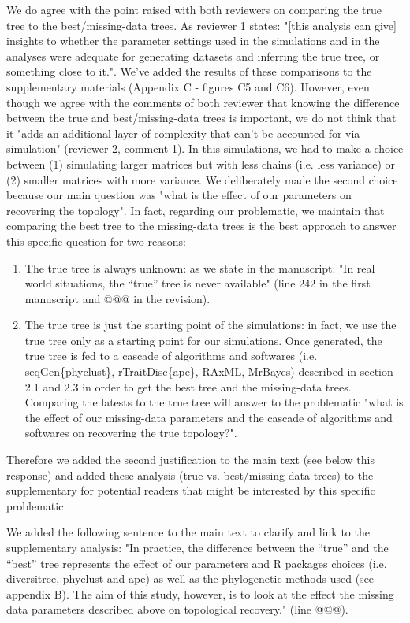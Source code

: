 \documentclass[12pt,letterpaper]{article}
\begin{document}
\begin{enumerate}
We do agree with the point raised with both reviewers on comparing the true tree to the best/missing-data trees.
As reviewer 1 states: "[this analysis can give] insights to whether the parameter settings used in the simulations and in the analyses were adequate for generating datasets and inferring the true tree, or something close to it.".
We've added the results of these comparisons to the supplementary materials (Appendix C - figures C5 and C6).
However, even though we agree with the comments of both reviewer that knowing the difference between the true and best/missing-data trees is important, we do not think that it "adds an additional layer of complexity that can't be accounted for via simulation" (reviewer 2, comment 1).
In this simulations, we had to make a choice between (1) simulating larger matrices but with less chains (i.e. less variance) or (2) smaller matrices with more variance.
We deliberately made the second choice because our main question was "what is the effect of our parameters on recovering the topology".
In fact, regarding our problematic, we maintain that comparing the best tree to the missing-data trees is the best approach to answer this specific question for two reasons:
\begin{enumerate}
\item{The true tree is always unknown:} as we state in the manuscript: "In real world situations, the ``true'' tree is never available" (line 242 in the first manuscript and @@@ in the revision).
\item{The true tree is just the starting point of the simulations:} in fact, we use the true tree only as a starting point for our simulations. Once generated, the true tree is fed to a cascade of algorithms and softwares (i.e. seqGen\{phyclust\}, rTraitDisc\{ape\}, RAxML, MrBayes) described in section 2.1 and 2.3 in order to get the best tree and the missing-data trees. Comparing the latests to the true tree will answer to the problematic "what is the effect of our missing-data parameters and the cascade of algorithms and softwares on recovering the true topology?".
\end{enumerate}
Therefore we added the second justification to the main text (see below this response) and added these analysis (true vs. best/missing-data trees) to the supplementary for potential readers that might be interested by this specific problematic.

We added the following sentence to the main text to clarify and link to the supplementary analysis:
"In practice, the difference between the ``true'' and the ``best'' tree represents the effect of our parameters and R packages choices (i.e. diversitree, phyclust and ape) as well as the phylogenetic methods used (see appendix B).
The aim of this study, however, is to look at the effect the missing data parameters described above on topological recovery." (line @@@).


\end{enumerate}
\end{document}
